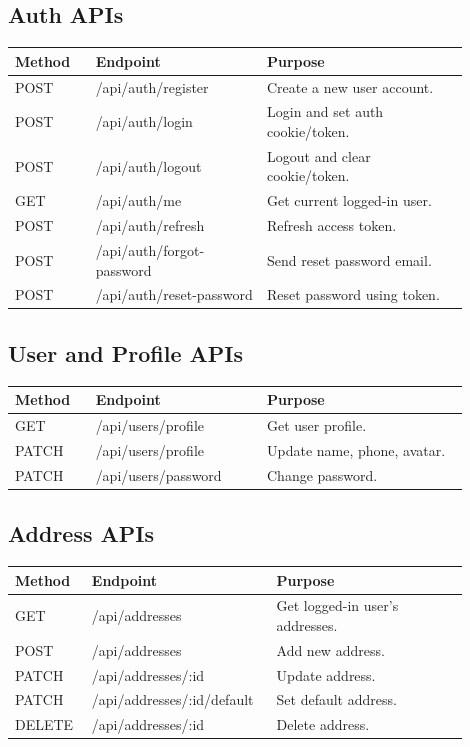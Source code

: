 \documentclass[11pt,a4paper]{article}
\begin{document}
\subsection{Auth APIs}

\begin{longtable}{p{0.16\linewidth} p{0.34\linewidth} p{0.40\linewidth}}
\toprule
\textbf{Method} & \textbf{Endpoint} & \textbf{Purpose} \\
\midrule
POST & /api/auth/register & Create a new user account. \\
POST & /api/auth/login & Login and set auth cookie/token. \\
POST & /api/auth/logout & Logout and clear cookie/token. \\
GET & /api/auth/me & Get current logged-in user. \\
POST & /api/auth/refresh & Refresh access token. \\
POST & /api/auth/forgot-password & Send reset password email. \\
POST & /api/auth/reset-password & Reset password using token. \\
\bottomrule
\end{longtable}

\subsection{User and Profile APIs}

\begin{longtable}{p{0.16\linewidth} p{0.34\linewidth} p{0.40\linewidth}}
\toprule
\textbf{Method} & \textbf{Endpoint} & \textbf{Purpose} \\
\midrule
GET & /api/users/profile & Get user profile. \\
PATCH & /api/users/profile & Update name, phone, avatar. \\
PATCH & /api/users/password & Change password. \\
\bottomrule
\end{longtable}

\subsection{Address APIs}

\begin{longtable}{p{0.16\linewidth} p{0.34\linewidth} p{0.40\linewidth}}
\toprule
\textbf{Method} & \textbf{Endpoint} & \textbf{Purpose} \\
\midrule
GET & /api/addresses & Get logged-in user's addresses. \\
POST & /api/addresses & Add new address. \\
PATCH & /api/addresses/:id & Update address. \\
PATCH & /api/addresses/:id/default & Set default address. \\
DELETE & /api/addresses/:id & Delete address. \\
\bottomrule
\end{longtable}
\end{document}
